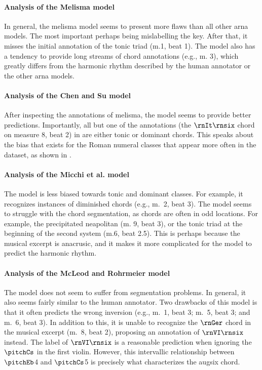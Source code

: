 \paragraph{Analysis of the Melisma model}

In general, the \gls{melisma} model seems to present more
flaws than all other \gls{arna} models. The most important
perhaps being mislabelling the key. After that, it misses
the initial annotation of the tonic triad (m.1, beat 1). The
model also has a tendency to provide long streams of chord
annotations (e.g., m. 3), which greatly differs from the
harmonic rhythm described by the human annotator or the
other \gls{arna} models. 

\paragraph{Analysis of the Chen and Su model}

After inspecting the annotations of \gls{melisma}, the
\textcite{chen2021attend} model seems to provide better
predictions. Importantly, all but one of the annotations
(the $\rnIt\rnsix$ chord on measure 8, beat 2) in
\textcite{chen2021attend} are either tonic or dominant
chords. This speaks about the bias that exists for the Roman
numeral classes that appear more often in the dataset, as
shown in . 

\paragraph{Analysis of the Micchi et al. model}

The \textcite{micchi2021deep} model is less biased towards
tonic and dominant classes. For example, it recognizes
instances of diminished chords (e.g., m.~2, beat 3). The
model seems to struggle with the chord segmentation, as
chords are often in odd locations. For example, the
precipitated \gls{neapolitan} (m. 9, beat 3), or the tonic
triad at the beginning of the second system (m.6, beat 2.5).
This is perhaps because the musical excerpt is anacrusic,
and it makes it more complicated for the model to predict
the harmonic rhythm. 

\paragraph{Analysis of the McLeod and Rohrmeier model}

The \textcite{mcleod2021modular} model does not seem to
suffer from segmentation problems. In general, it also seems
fairly similar to the human annotator. Two drawbacks of this
model is that it often predicts the wrong inversion (e.g.,
m.~1, beat 3; m.~5, beat 3; and m.~6, beat 3). In addition
to this, it is unable to recognize the $\rnGer$ chord in the
musical excerpt (m.~8, beat 2), proposing an annotation of
$\rnVI\rnsix$ instead. The label of $\rnVI\rnsix$ is a
reasonable prediction when ignoring the $\pitchCs$ in the
first violin. However, this intervallic relationship between
$\pitchEb$4 and $\pitchCs$5 is precisely what characterizes
the \gls{augsix} chord.

